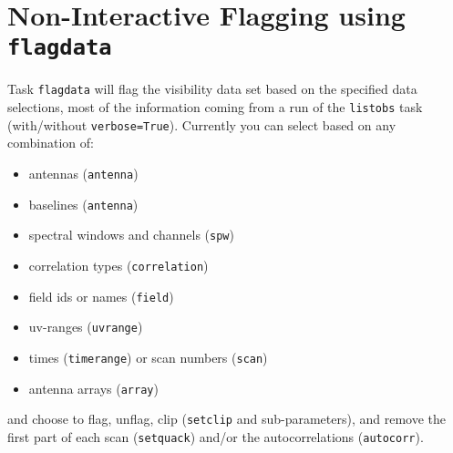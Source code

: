 \section{Non-Interactive Flagging using {\tt flagdata}}
\label{section:edit.flagdata}

Task {\tt flagdata} will flag the visibility data set based on the
specified data selections, most of the information coming from a run
of the {\tt listobs} task (with/without {\tt verbose=True}). Currently you can
select based on any combination of: 

\begin{itemize}
   \item antennas ({\tt antenna})
   \item baselines ({\tt antenna})
   \item spectral windows and channels ({\tt spw})
   \item correlation types ({\tt correlation})
   \item field ids or names ({\tt field})
   \item uv-ranges ({\tt uvrange})
   \item times ({\tt timerange}) or scan numbers ({\tt scan})
   \item antenna arrays ({\tt array})
\end{itemize}

and choose to flag, unflag, clip ({\tt setclip} and sub-parameters), and
remove the first part of each scan ({\tt setquack}) and/or the 
autocorrelations ({\tt autocorr}).

